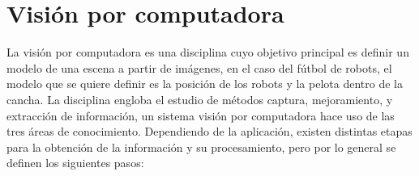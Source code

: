 
\section{Visión por computadora}

La visión por computadora es una disciplina cuyo objetivo principal es definir
un modelo de una escena a partir de imágenes\cite{cvLinda2001}, en el caso del
fútbol de robots, el modelo que se quiere definir es la posición de los robots y
la pelota dentro de la cancha. La disciplina engloba el estudio de métodos
captura, mejoramiento, y extracción de información, un sistema visión por
computadora hace uso de las tres áreas de conocimiento. Dependiendo de la
aplicación, existen distintas etapas para la obtención de la información y su
procesamiento, pero por lo general se definen los siguientes
pasos\cite{digitalImageProcessing2ed, wikiCV}:

